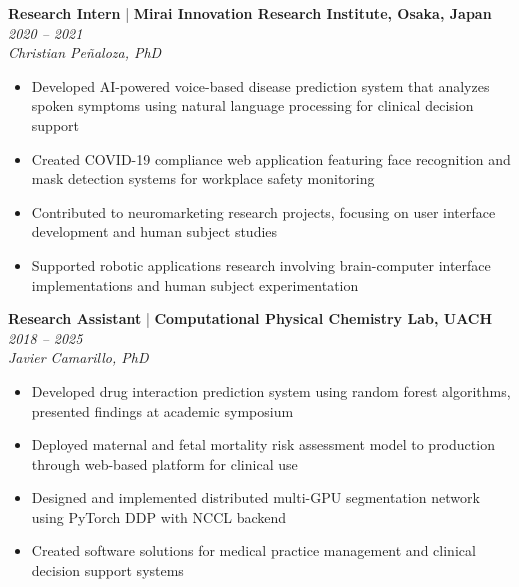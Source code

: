 \textbf{Research Intern} | \textbf{Mirai Innovation Research Institute, Osaka, Japan} 
\hfill {
   \textit{
   \color{lightgray}
   2020 -- 2021
   }
} \\
\textit{
   \color{mediumgray}
   Christian Peñaloza, PhD
}
\begin{itemize}
   \item Developed AI-powered voice-based disease prediction system that analyzes spoken symptoms using natural language processing for clinical decision support
   \item Created COVID-19 compliance web application featuring face recognition and mask detection systems for workplace safety monitoring
   \item Contributed to neuromarketing research projects, focusing on user interface development and human subject studies
   \item Supported robotic applications research involving brain-computer interface implementations and human subject experimentation
\end{itemize}

\textbf{Research Assistant} | \textbf{Computational Physical Chemistry Lab, UACH} 
\hfill {
   \textit{
   \color{lightgray}
   2018 -- 2025
   }
} \\
\textit{
   \color{mediumgray}
   Javier Camarillo, PhD
}
\begin{itemize}
   \item Developed drug interaction prediction system using random forest algorithms, presented findings at academic symposium
   \item Deployed maternal and fetal mortality risk assessment model to production through web-based platform for clinical use
   \item Designed and implemented distributed multi-GPU segmentation network using PyTorch DDP with NCCL backend
   \item Created software solutions for medical practice management and clinical decision support systems
\end{itemize}